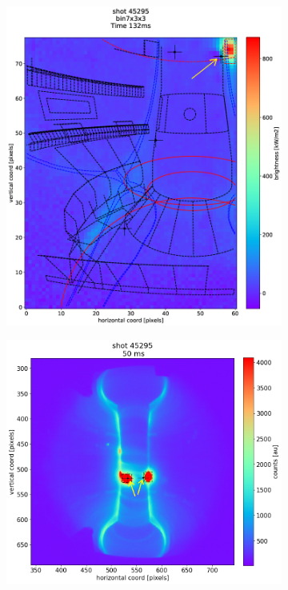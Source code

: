 \begin{figure}
     \centering
     \begin{subfigure}{0.48\linewidth}
        \centering
        \includegraphics[width=\textwidth,trim={15 10 0 20},clip]{Chapters/chapter2/figs/IRVB-MASTU_shot-45295_export_4.png}
        \vspace*{-6mm}
        {\color{white}\caption{\phantom{ }}\label{fig:MAST-U_HFS_MID_L08_1}}
     \end{subfigure}
     \begin{subfigure}{0.48\linewidth}
        \vspace*{2mm}
        \centering
        \includegraphics[width=\textwidth,trim={55 41 0 50},clip]{Chapters/chapter2/figs/45295_for_paper3.png}

\end{subfigure}
\end{figure}

